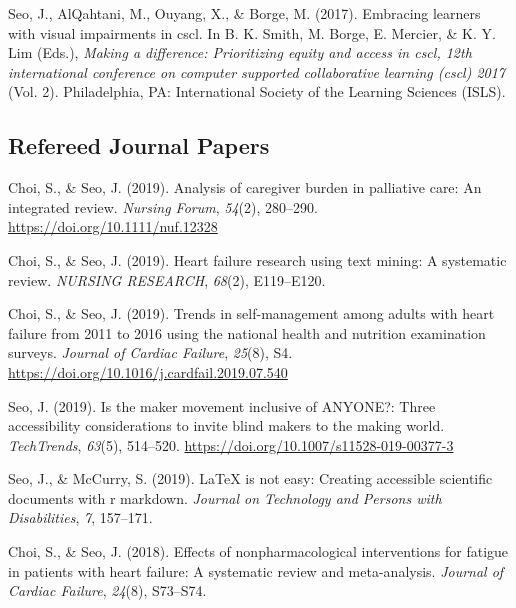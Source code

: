 \documentclass[11pt,a4paper,]{moderncv}
\newcounter{papers}
\begin{document}
\leavevmode\hypertarget{ref-seo2017embracing}{}%
Seo, J., AlQahtani, M., Ouyang, X., \& Borge, M. (2017). Embracing learners with visual impairments in cscl. In B. K. Smith, M. Borge, E. Mercier, \& K. Y. Lim (Eds.), \emph{Making a difference: Prioritizing equity and access in cscl, 12th international conference on computer supported collaborative learning (cscl) 2017} (Vol. 2). Philadelphia, PA: International Society of the Learning Sciences (ISLS).

\endgroup

\hypertarget{refereed-journal-papers}{%
\subsection{Refereed Journal Papers}\label{refereed-journal-papers}}

\begingroup
\setlength{\parindent}{-0.5in}
\setlength{\leftskip}{0.5in}

\hypertarget{refs_journals}{}
\leavevmode\hypertarget{ref-doi:10.1111ux2fnuf.12328}{}%
Choi, S., \& Seo, J. (2019). Analysis of caregiver burden in palliative care: An integrated review. \emph{Nursing Forum}, \emph{54}(2), 280--290. \url{https://doi.org/10.1111/nuf.12328}

\leavevmode\hypertarget{ref-choi2019heart}{}%
Choi, S., \& Seo, J. (2019). Heart failure research using text mining: A systematic review. \emph{NURSING RESEARCH}, \emph{68}(2), E119--E120.

\leavevmode\hypertarget{ref-choi2019trends}{}%
Choi, S., \& Seo, J. (2019). Trends in self-management among adults with heart failure from 2011 to 2016 using the national health and nutrition examination surveys. \emph{Journal of Cardiac Failure}, \emph{25}(8), S4. \url{https://doi.org/10.1016/j.cardfail.2019.07.540}

\leavevmode\hypertarget{ref-seo2019maker}{}%
Seo, J. (2019). Is the maker movement inclusive of ANYONE?: Three accessibility considerations to invite blind makers to the making world. \emph{TechTrends}, \emph{63}(5), 514--520. \url{https://doi.org/10.1007/s11528-019-00377-3}

\leavevmode\hypertarget{ref-seo2019arow}{}%
Seo, J., \& McCurry, S. (2019). LaTeX is not easy: Creating accessible scientific documents with r markdown. \emph{Journal on Technology and Persons with Disabilities}, \emph{7}, 157--171.

\leavevmode\hypertarget{ref-choi2018effects}{}%
Choi, S., \& Seo, J. (2018). Effects of nonpharmacological interventions for fatigue in patients with heart failure: A systematic review and meta-analysis. \emph{Journal of Cardiac Failure}, \emph{24}(8), S73--S74.
\end{document}
